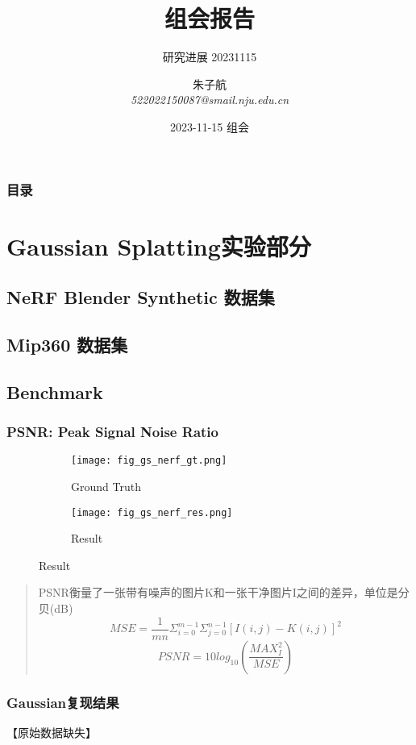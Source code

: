\documentclass{njupre/njupre}
\title[组会]{组会报告}
\subtitle{研究进展 20231115}
\author[朱子航]{\texorpdfstring{朱子航 \\ \smallskip \textit{522022150087@smail.nju.edu.cn}}{}}
\date[2023-11-15]{\texorpdfstring{2023-11-15 组会}{}}
\begin{document}
\begin{frame}
    \titlepage
\end{frame}
\begin{frame}
    \frametitle{目录}
    \tableofcontents
\end{frame}
\section{Gaussian Splatting实验部分}

\subsection{NeRF Blender Synthetic 数据集}

\subsection{Mip360 数据集}

\subsection{Benchmark}
\begin{frame}
\frametitle{PSNR: Peak Signal Noise Ratio}

\begin{figure}
    \centering
    \begin{subfigure}{0.25\linewidth}
        \texttt{[image: fig\_gs\_nerf\_gt.png]}
        \caption{Ground Truth}
    \end{subfigure}
    \begin{subfigure}{0.25\linewidth}
        \texttt{[image: fig\_gs\_nerf\_res.png]}
        \caption{Result}
    \end{subfigure}
\end{figure}

\begin{quote}
    PSNR衡量了一张带有噪声的图片K和一张干净图片I之间的差异，单位是分贝(dB)
    $$MSE = \frac{1}{mn}\Sigma_{i=0}^{m-1}\Sigma_{j=0}^{n-1}[I(i,j) - K(i,j)]^2$$
    $$PSNR = 10 log_{10}(\frac{MAX_I^2}{MSE})$$ 
\end{quote}

\end{frame}

\begin{frame}
\frametitle{Gaussian复现结果}
【原始数据缺失】
\end{frame}
\end{document}
